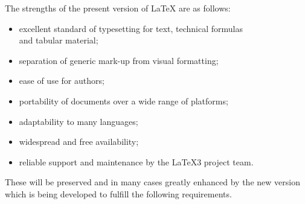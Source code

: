 \documentclass[a4paper]{article}
\begin{document}
The strengths of the present version of \LaTeX{} are
as follows:
 \begin{itemize}
 \item excellent standard of typesetting for text, technical
formulas\\
and tabular material;
 \item  separation of generic mark-up from visual formatting;
 \item  ease of use for authors;
 \item  portability of documents over a wide range of platforms;
 \item  adaptability to many languages;
 \item  widespread and free availability;
 \item  reliable support and maintenance by the \LaTeX3 project team.
 \end{itemize}
 These will be preserved and in many cases greatly enhanced by the new
 version which is being developed to fulfill the following requirements.
\end{document}
